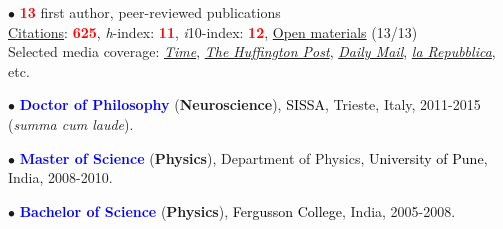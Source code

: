 \documentclass[10pt]{article}
\begin{document}
	
	

	
	$\bullet$ \textbf{\textcolor{red}{13}} first author, peer-reviewed publications\\
	\hspace*{0.1in}\href{https://scholar.google.it/citations?user=kSYuYTUAAAAJ&hl=en&oi=ao}{Citations}: \textbf{\textcolor{red}{625}}, \textit{h}-index: \textbf{\textcolor{red}{11}}, \textit{i}10-index: \textbf{\textcolor{red}{12}}, \href{https://osf.io/hk5f3/}{Open materials} (13/13)\\
	\hspace*{0.1in}Selected media coverage: \href{http://time.com/3242/driving-over-your-best-friend-its-the-right-thing-to-do/}{\textit{Time}}, \href{http://www.huffingtonpost.com/entry/autism-empathy-brain-research_us_56f92575e4b014d3fe237413}{\textit{The Huffington Post}}, \href{http://www.dailymail.co.uk/sciencetech/article-4308284/Virtual-reality-experiment-puts-altruism-test.html}{\textit{Daily Mail}}, \href{http://www.repubblica.it/scienze/2017/04/11/news/area_cervello_perdono-162669836/?rss}{\textit{la Repubblica}}, etc.

	
	$\bullet$ \textbf{\textcolor{blue}{Doctor of Philosophy}} (\textbf{Neuroscience}), \textcolor{black}{SISSA}, Trieste, Italy, 2011-2015 (\textit{summa cum laude}).\\ 
	 \miniskip
	
	$\bullet$ \textbf{\textcolor{blue}{Master of Science}} (\textbf{Physics}), Department of Physics, \textcolor{black}{University of Pune}, India, 2008-2010.\\%
	\miniskip
	
	$\bullet$ \textbf{\textcolor{blue}{Bachelor of Science}} (\textbf{Physics}), \textcolor{black}{Fergusson College}, India, 2005-2008.%
\end{document}
